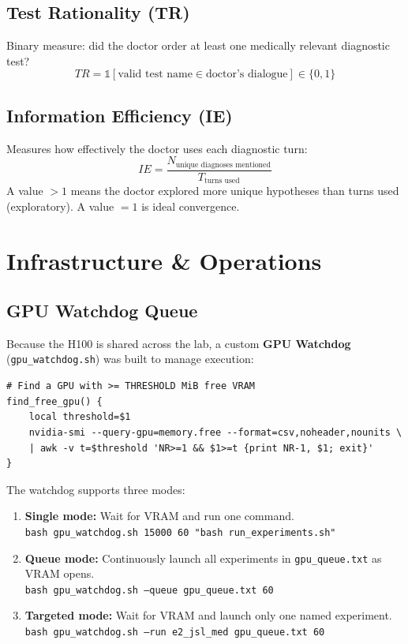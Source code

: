 \documentclass[12pt, a4paper]{article}
\begin{document}
\subsection{Test Rationality (TR)}

Binary measure: did the doctor order at least one medically relevant diagnostic test?
\[
TR = \mathbb{1}\left[\text{valid test name} \in \text{doctor's dialogue}\right] \in \{0, 1\}
\]

\subsection{Information Efficiency (IE)}

Measures how effectively the doctor uses each diagnostic turn:
\[
IE = \frac{N_{\text{unique diagnoses mentioned}}}{T_{\text{turns used}}}
\]
A value $> 1$ means the doctor explored more unique hypotheses than turns used (exploratory). A value $= 1$ is ideal convergence.

\section{Infrastructure \& Operations}

\subsection{GPU Watchdog Queue}

Because the H100 is shared across the lab, a custom \textbf{GPU Watchdog} (\texttt{gpu\_watchdog.sh}) was built to manage execution:

\begin{lstlisting}[style=bashstyle]
# Find a GPU with >= THRESHOLD MiB free VRAM
find_free_gpu() {
    local threshold=$1
    nvidia-smi --query-gpu=memory.free --format=csv,noheader,nounits \
    | awk -v t=$threshold 'NR>=1 && $1>=t {print NR-1, $1; exit}'
}
\end{lstlisting}

\noindent The watchdog supports three modes:
\begin{enumerate}
    \item \textbf{Single mode:} Wait for VRAM and run one command.\\
          \texttt{bash gpu\_watchdog.sh 15000 60 "bash run\_experiments.sh"}
    \item \textbf{Queue mode:} Continuously launch all experiments in \texttt{gpu\_queue.txt} as VRAM opens.\\
          \texttt{bash gpu\_watchdog.sh --queue gpu\_queue.txt 60}
    \item \textbf{Targeted mode:} Wait for VRAM and launch only one named experiment.\\
          \texttt{bash gpu\_watchdog.sh --run e2\_jsl\_med gpu\_queue.txt 60}
\end{enumerate}
\end{document}
